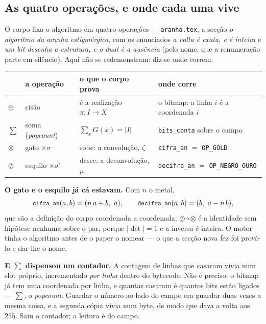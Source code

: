 \documentclass[11pt,a4paper]{article}
\newcommand{\code}[1]{\texttt{\small #1}}
\newcommand{\abs}[1]{\lvert #1\rvert}
\begin{document}
\subsection*{As quatro operações, e onde cada uma vive}

\noindent O corpo fixa o algoritmo em quatro operações --- \code{aranha.tex}, a
secção \emph{o algoritmo da aranha estigmérgica}, com os enunciados \emph{a volta
é exata, e é inteira} e \emph{um bit desenha a estrutura, e o dual é a ausência}
(pelo nome, que a renumeração parte em silêncio). Aqui não se redemonstram:
diz-se onde correm.

\begin{center}\small
\begin{tabular}{@{}llll@{}}
\toprule
 & a operação & o que o corpo prova & onde corre \\
\midrule
$\oplus$ & cisão & é a realização $\pi\colon I\to X$ & o bitmap: a linha $i$ é a coordenada $i$ \\
$\sum$ & soma (\emph{popcount}) & $\sum_x G(x)=\abs{I}$ & \code{bits\_conta} sobre o campo \\
$\otimes$ & gato $\times\sigma$ & sobe: a convolução, $\zeta$ & \code{cifra\_an} $=$ \code{OP\_GOLD} \\
$\oslash$ & esquilo $\times\sigma'$ & desce: a deconvolução, $\mu$ & \code{decifra\_an} $=$ \code{OP\_NEGRO\_OURO} \\
\bottomrule
\end{tabular}
\end{center}

\noindent\textbf{O gato e o esquilo já cá estavam.} Com $n$ o metal,
\[
\code{cifra\_an}(a,b)=(n\,a+b,\ a),
\qquad
\code{decifra\_an}(a,b)=(b,\ a-n\,b),
\]
que são a definição do corpo coordenada a coordenada; $\oslash\circ\otimes$ é a
identidade sem hipótese nenhuma sobre o par, porque $\lvert\det\rvert=1$ e a
inversa é inteira. O motor tinha o algoritmo antes de o paper o nomear ---
o que a secção nova fez foi prová-lo e dar-lhe o nome.

\medskip\noindent\textbf{E $\sum$ dispensou um contador.} A contagem de linhas
que casaram vivia num slot próprio, incrementado \emph{por linha} dentro do
bytecode. Não é preciso: o bitmap já tem uma coordenada por linha, e quantas
casaram é quantos bits estão ligados --- $\sum$, o \emph{popcount}. Guardar o
número ao lado do campo era guardar duas vezes a mesma coisa, e a segunda cópia
vivia num byte, de modo que dava a volta aos $255$. Saiu o contador; a leitura é
do campo.
\end{document}
